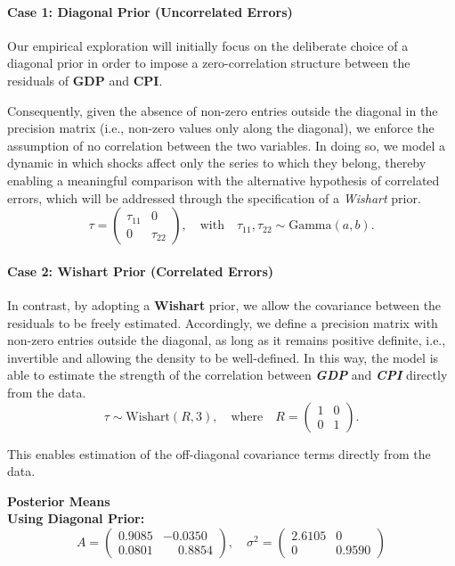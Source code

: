 \documentclass{Configuration_Files/PoliMi3i_thesis}
\begin{document}
\paragraph{Case 1: Diagonal Prior (Uncorrelated Errors)}
Our empirical exploration will initially focus on the deliberate choice of a diagonal prior in order to impose a zero-correlation structure between the residuals of \textbf{GDP} and \textbf{CPI}. 

Consequently, given the absence of non-zero entries outside the diagonal in the precision matrix (i.e., non-zero values only along the diagonal), we enforce the assumption of no correlation between the two variables. In doing so, we model a dynamic in which shocks affect only the series to which they belong, thereby enabling a meaningful comparison with the alternative hypothesis of correlated errors, which will be addressed through the specification of a \textit{Wishart} prior.
\[
\tau =
\begin{pmatrix}
\tau_{11} & 0 \\
0 & \tau_{22}
\end{pmatrix}, 
\quad \text{with} \quad
\tau_{11}, \tau_{22} \sim \text{Gamma}(a, b).
\]

\paragraph{Case 2: Wishart Prior (Correlated Errors)}
In contrast, by adopting a \textbf{Wishart} prior, we allow the covariance between the residuals to be freely estimated. Accordingly, we define a precision matrix with non-zero entries outside the diagonal, as long as it remains positive definite, i.e., invertible and allowing the density to be well-defined. In this way, the model is able to estimate the strength of the correlation between \textbf{\textit{GDP}} and \textbf{\textit{CPI}} directly from the data. 
\[
\tau \sim \text{Wishart}(R, 3), \quad \text{where} \quad
R = \begin{pmatrix}
1 & 0 \\
0 & 1
\end{pmatrix}.
\]

This enables estimation of the off-diagonal covariance terms directly from the data.

\newpage

\textbf{Posterior Means}\\

\textbf{Using Diagonal Prior:}
\[
A =
\begin{pmatrix}
0.9085 & -0.0350 \\
0.0801 & \phantom{-}0.8854
\end{pmatrix}, \quad
\sigma^2 =
\begin{pmatrix}
2.6105 & 0 \\
0 & 0.9590
\end{pmatrix}
\]
\end{document}
